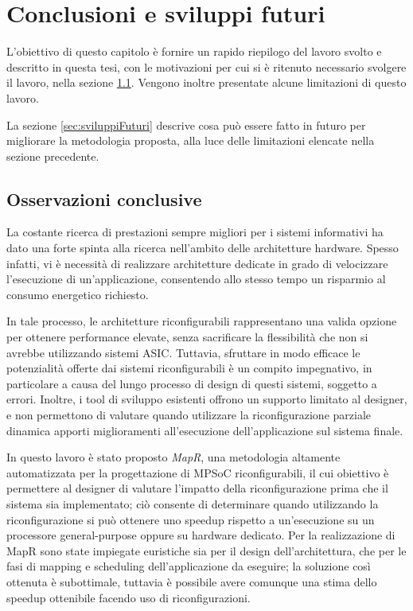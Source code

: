 \chapter{Conclusioni e sviluppi futuri}
\label{chap:conclusioni}
\vspace{1cm}
L'obiettivo di questo capitolo \`e fornire un rapido riepilogo del lavoro svolto
e descritto in questa tesi, con le motivazioni per cui si \`e ritenuto necessario
svolgere il lavoro, nella sezione \ref{sec:osservazioniConclusiveCap7}. Vengono inoltre
presentate alcune limitazioni di questo lavoro.

La sezione \ref{sec:sviluppiFuturi} descrive cosa pu\`o essere fatto in futuro
per migliorare la metodologia proposta, alla luce delle limitazioni elencate
nella sezione precedente.

\newpage


\section{Osservazioni conclusive}
\label{sec:osservazioniConclusiveCap7}
La costante ricerca di prestazioni sempre migliori per i sistemi informativi
ha dato una forte spinta alla ricerca nell'ambito delle architetture hardware.
Spesso infatti, vi \`e necessit\`a di realizzare architetture dedicate in grado di
velocizzare l'esecuzione di un'applicazione, consentendo allo stesso tempo
un risparmio al consumo energetico richiesto.

In tale processo, le architetture riconfigurabili rappresentano una valida opzione
per ottenere performance elevate, senza sacrificare la flessibilit\`a che non si avrebbe
utilizzando sistemi \ac{ASIC}. Tuttavia, sfruttare in modo efficace le potenzialit\`a
offerte dai sistemi riconfigurabili \`e un compito impegnativo, in particolare a causa
del lungo processo di design di questi sistemi, soggetto a errori.
Inoltre, i tool di sviluppo esistenti offrono un supporto limitato al designer, e non permettono
di valutare quando utilizzare la riconfigurazione parziale dinamica apporti miglioramenti
all'esecuzione dell'applicazione sul sistema finale.

In questo lavoro \`e stato proposto \emph{MapR}, una metodologia
altamente automatizzata per la progettazione di \acs{MPSoC} riconfigurabili, il cui
obiettivo \`e permettere al designer di valutare l'impatto della riconfigurazione prima che il sistema
sia implementato; ci\`o consente di determinare quando utilizzando la riconfigurazione si pu\`o
ottenere uno speedup rispetto a un'esecuzione su un processore general-purpose oppure
su hardware dedicato.
Per la realizzazione di MapR sono state impiegate euristiche sia per il design dell'architettura, che per
le fasi di mapping e scheduling dell'applicazione da eseguire; la soluzione cos\`i ottenuta \`e
subottimale, tuttavia \`e possibile avere comunque una stima dello speedup ottenibile
facendo uso di riconfigurazioni.

